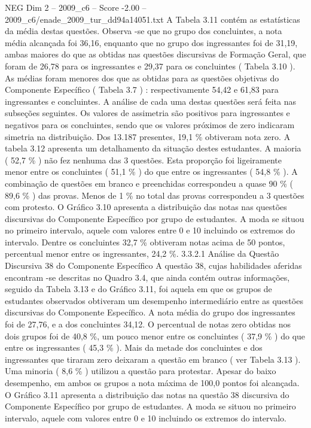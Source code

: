 \begin{textsample}{NEG Dim 2 – 2009\_c6 – Score -2.00 – 2009\_c6/enade\_2009\_tur\_dd94a14051.txt}
A Tabela 3.11 contém as estatísticas da média destas questões.
Observa -se que no grupo dos concluintes, a nota média alcançada foi 36,16, enquanto que no grupo dos ingressantes foi de 31,19, ambas maiores do que as obtidas nas questões discursivas de Formação Geral, que foram de 26,78 para os ingressantes e 29,37 para os concluintes ( Tabela 3.10 ).
As médias foram menores dos que as obtidas para as questões objetivas do Componente Específico ( Tabela 3.7 ) : respectivamente 54,42 e 61,83 para ingressantes e concluintes.
A análise de cada uma destas questões será feita nas subseções seguintes.
Os valores de assimetria são positivos para ingressantes e negativos para os concluintes, sendo que os valores próximos de zero indicaram simetria na distribuição.
Dos 13.187 presentes, 19,1 \% obtiveram nota zero.
A tabela 3.12 apresenta um detalhamento da situação destes estudantes.
A maioria ( 52,7 \% ) não fez nenhuma das 3 questões.
Esta proporção foi ligeiramente menor entre os concluintes ( 51,1 \% ) do que entre os ingressantes ( 54,8 \% ).
A combinação de questões em branco e preenchidas correspondeu a quase 90 \% ( 89,6 \% ) das provas.
Menos de 1 \% no total das provas correspondeu a 3 questões com protesto.
O Gráfico 3.10 apresenta a distribuição das notas nas questões discursivas do Componente Específico por grupo de estudantes.
A moda se situou no primeiro intervalo, aquele com valores entre 0 e 10 incluindo os extremos do intervalo.
Dentre os concluintes 32,7 \% obtiveram notas acima de 50 pontos, percentual menor entre os ingressantes, 24,2 \%. 3.3.2.1 Análise da Questão Discursiva 38 do Componente Específico A questão 38, cujas habilidades aferidas encontram -se descritas no Quadro 3.4, que ainda contém outras informações, seguido da Tabela 3.13 e do Gráfico 3.11, foi aquela em que os grupos de estudantes observados obtiveram um desempenho intermediário entre as questões discursivas do Componente Específico.
A nota média do grupo dos ingressantes foi de 27,76, e a dos concluintes 34,12.
O percentual de notas zero obtidas nos dois grupos foi de 40,8 \%, um pouco menor entre os concluintes ( 37,9 \% ) do que entre os ingressantes ( 45,3 \% ).
Mais da metade dos concluintes e dos ingressantes que tiraram zero deixaram a questão em branco ( ver Tabela 3.13 ).
Uma minoria ( 8,6 \% ) utilizou a questão para protestar.
Apesar do baixo desempenho, em ambos os grupos a nota máxima de 100,0 pontos foi alcançada.
O Gráfico 3.11 apresenta a distribuição das notas na questão 38 discursiva do Componente Específico por grupo de estudantes.
A moda se situou no primeiro intervalo, aquele com valores entre 0 e 10 incluindo os extremos do intervalo.

\end{textsample}
